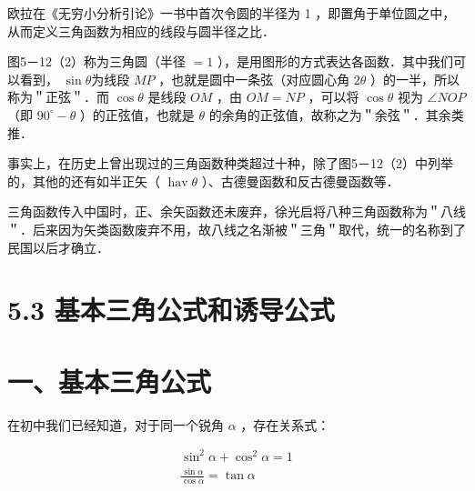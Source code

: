 \documentclass[10pt]{article}
\begin{document}
欧拉在《无穷小分析引论》一书中首次令圆的半径为 1 ，即置角于单位圆之中，从而定义三角函数为相应的线段与圆半径之比．

图5－12（2）称为三角圆（半径 \(=1\) ），是用图形的方式表达各函数．其中我们可以看到， \(\sin \theta\)为线段 \(M P\) ，也就是圆中一条弦（对应圆心角 \(2 \theta\) ）的一半，所以称为＂正弦＂．而 \(\cos \theta\) 是线段 \(O M\) ，由 \(O M=N P\) ，可以将 \(\cos \theta\) 视为 \(\angle N O P\)（即 \(90^{\circ}-\theta\) ）的正弦值，也就是 \(\theta\) 的余角的正弦值，故称之为＂余弦＂．其余类推．

事实上，在历史上曾出现过的三角函数种类超过十种，除了图5－12（2）中列举的，其他的还有如半正矢（ \(\operatorname{hav} \theta\) ）、古德曼函数和反古德曼函数等．

三角函数传入中国时，正、余矢函数还未废弃，徐光启将八种三角函数称为＂八线＂．后来因为矢类函数废弃不用，故八线之名渐被＂三角＂取代，统一的名称到了民国以后才确立．

\section*{5.3 基本三角公式和诱导公式}
\section*{一、基本三角公式}
在初中我们已经知道，对于同一个锐角 \(\alpha\) ，存在关系式：

\[
\begin{gathered}
\sin ^{2} \alpha+\cos ^{2} \alpha=1 \\
\frac{\sin \alpha}{\cos \alpha}=\tan \alpha
\end{gathered}
\]
\end{document}

